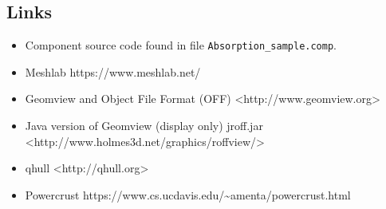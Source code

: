 \subsection*{Links}
\begin{itemize}
  \item Component source code found in file \texttt{Absorption\_sample.comp}.
  \item Meshlab https://www.meshlab.net/
  \item Geomview and Object File Format (OFF) \textless{}http://www.geomview.org\textgreater{}
  \item Java version of Geomview (display only) jroff.jar \textless{}http://www.holmes3d.net/graphics/roffview/\textgreater{}
  \item qhull \textless{}http://qhull.org\textgreater{}
  \item Powercrust https://www.cs.ucdavis.edu/\textasciitilde{}amenta/powercrust.html
\end{itemize}
